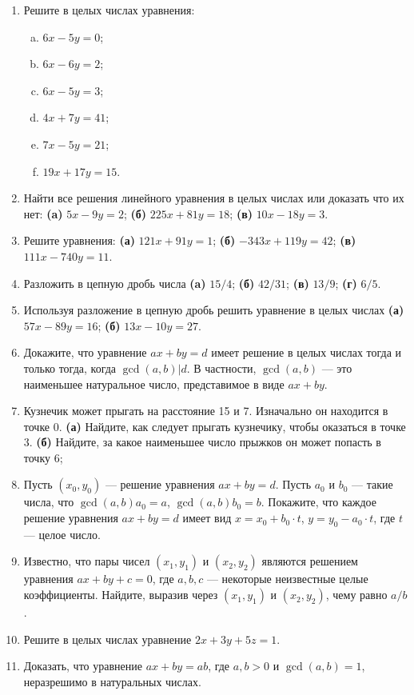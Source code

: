 \begin{enumerate}
\item Решите в целых числах уравнения:
\begin{enumerate}[a)]
\item $6x-5y = 0$;
\item $6x-6y = 2$;
\item $6x - 5y = 3$;
\item $4x + 7y = 41$;
\item $7x - 5y = 21$;
\item $19x + 17y = 15$.
\end{enumerate}


\item Найти все решения линейного уравнения в целых числах или доказать что их нет:
\textbf{(a)} $5x-9y=2$; \textbf{(б)} $225x+81y=18$; \textbf{(в)} $10x-18y=3$.

\item Решите уравнения: \textbf{(а)} $121x + 91y = 1$; \textbf{(б)} $-343x + 119y = 42$;
\textbf{(в)} $111x - 740y = 11$.

\item Разложить в цепную дробь числа \textbf{(a)} $15/4$; \textbf{(б)} $42/31$; \textbf{(в)} $13/9$;
\textbf{(г)} $6/5$.

\item Используя разложение в цепную дробь решить уравнение в целых числах
\textbf{(а)} $57x - 89y = 16$; \textbf{(б)} $13x - 10y = 27$.

\item Докажите, что уравнение $ax + by = d$ имеет решение в целых
числах тогда и только тогда, когда $\gcd(a, b)|d$. В частности,
$\gcd(a, b)$ --- это наименьшее натуральное число, представимое в
виде $ax + by$.

\item Кузнечик может прыгать на расстояние 15 и 7. Изначально он
находится в точке 0. \textbf{(а)} Найдите, как следует прыгать кузнечику,
чтобы оказаться в точке 3. \textbf{(б)} Найдите, за какое наименьшее число
прыжков он может попасть в точку 6;

\item Пусть $(x_0, y_0)$ --- решение уравнения $ax + by = d$. Пусть $a_0$ и $b_0$
--- такие числа, что $\gcd(a, b)a_0 = a$, $\gcd(a, b)b_0 = b$. Покажите,
что каждое решение уравнения $ax + by = d$ имеет вид $x = x_0 + b_0 \cdot t$,
$y = y_0 - a_0 \cdot t$, где $t$ --- целое число.

\item Известно, что пары чисел $(x_1 , y_1)$ и $(x_2 , y_2)$ являются решением
 уравнения $ax + by + c = 0$, где $a, b, c$ --- некоторые неизвестные
целые коэффициенты. Найдите, выразив через $(x_1, y_1)$ и $(x_2, y_2)$,
чему равно $a/b$.

\item Решите в целых числах уравнение $2x + 3y + 5z = 1$.

\item Доказать, что уравнение $ax+by=ab$, где $a,b>0$ и $\gcd(a,b)=1$, неразрешимо в натуральных числах.
\end{enumerate}





